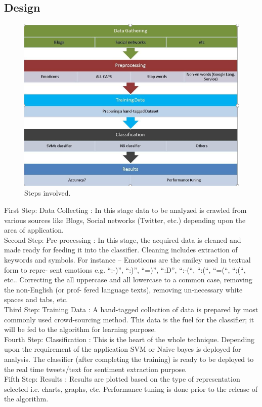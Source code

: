 \subsection{Design}
\begin{figure}[H]
	\includegraphics[width=\linewidth]{design.png}
	\caption{Steps involved.}
	\label{fig:boat1}
\end{figure}
First Step: Data Collecting : In this stage data to be analyzed is crawled from various sources like Blogs, Social networks (Twitter, etc.) depending upon the area of application.\\
Second Step: Pre-processing : In this stage, the acquired data is cleaned and made ready for feeding it into the classifier. Cleaning includes extraction of keywords and symbols. For instance – Emoticons are the smiley used in textual form to repre- sent emotions e.g. “:-)”, “:)”, “=)”, “:D”, “:-(“, “:(“, “=(“, “;(“, etc.. Correcting the all uppercase and all lowercase to a common case, removing the non-English (or prof- fered language texts), removing un-necessary white spaces and tabs, etc.\\
Third Step: Training Data : A hand-tagged collection of data is prepared by most commonly used crowd-sourcing method. This data is the fuel for the classifier; it will be fed to the algorithm for learning purpose.\\
Fourth Step: Classification : This is the heart of the whole technique. Depending upon the requirement of the application SVM or Naive bayes is deployed for analysis. The classifier (after completing the training) is ready to be deployed to the real time tweets/text for sentiment extraction purpose.\\
Fifth Step: Results : Results are plotted based on the type of representation selected i.e. charts, graphs, etc. Performance tuning is done prior to the release of the algorithm.

